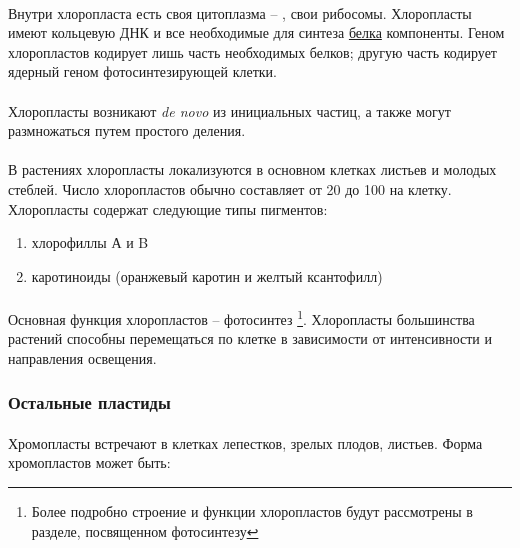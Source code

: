 \paragraph*{}Внутри хлоропласта есть своя цитоплазма -- , свои рибосомы. Хлоропласты имеют кольцевую ДНК и все необходимые для синтеза \hyperlink{proteins}{белка} компоненты. Геном хлоропластов кодирует лишь часть необходимых белков; другую часть кодирует ядерный геном фотосинтезирующей клетки. 

\paragraph*{}Хлоропласты возникают \textit{de novo} из инициальных частиц, а также могут размножаться путем простого деления.

\paragraph*{}В растениях хлоропласты локализуются в основном клетках листьев и молодых стеблей. Число хлоропластов обычно составляет от 20 до 100 на клетку. Хлоропласты содержат следующие типы пигментов:

\begin{enumerate}

\item хлорофиллы А и B
\item каротиноиды (оранжевый каротин и желтый ксантофилл)

\end{enumerate}

\paragraph*{}Основная функция хлоропластов -- фотосинтез \footnote{Более подробно строение и функции хлоропластов будут рассмотрены в разделе, посвященном фотосинтезу}. Хлоропласты большинства растений способны перемещаться по клетке в зависимости от интенсивности и направления освещения.

\subsubsection*{Остальные пластиды}

\paragraph*{}Хромопласты встречают в клетках лепестков, зрелых плодов, листьев.
Форма хромопластов может быть: 

